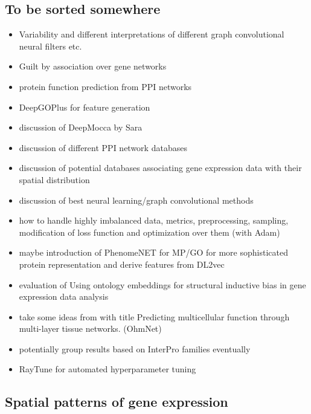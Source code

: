 \documentclass[]{article}
\renewcommand{\cite}{\citep}
\begin{document}
\subsection*{To be sorted somewhere}
\begin{itemize}
	\item Variability and different interpretations of different graph convolutional neural filters \cite{GCNConv, GENConv2020, SAGEConv} etc.
	\item Guilt by association over gene networks \cite{Oliver2000, Gillis2012}
	\item protein function prediction from PPI networks \cite{Vazquez2003}
	\item DeepGOPlus for feature generation \cite{DeepGoPlus}
	\item discussion of DeepMocca by Sara \cite{DeepMocca2021}
	\item discussion of different PPI network databases \cite{STRINGv10}
	\item discussion of potential databases associating gene expression data with their spatial distribution \cite{hawrylycz_digital_2011}
	\item discussion of best neural learning/graph convolutional methods \cite{Pytorch, PytorchGeometric}
	\item how to handle highly imbalanced data, metrics, preprocessing, sampling, modification of loss function \cite{Jeni2013} and optimization over them (with Adam\cite{Adam2014})
	\item maybe introduction of PhenomeNET for MP/GO for more sophisticated protein representation \cite{PhenomeNET2011, GOoriginal2000, GOrecent2020, MP2009} and derive features from DL2vec \cite{DL2vec2020, Word2vec2013}
	\item evaluation of \glqq Using ontology embeddings for structural inductive bias in gene expression data analysis\grqq{}\cite{Trebacz2020}
	\item take some ideas from \citet{Zitnik2017} with title \glqq Predicting multicellular function through multi-layer tissue networks\grqq{}. (OhmNet)
	\item potentially group results based on InterPro\cite{Interpro2020} families eventually
	\item RayTune\cite{liaw2018tune} for automated hyperparameter tuning
\end{itemize}

\subsection*{Spatial patterns of gene expression}
\end{document}
